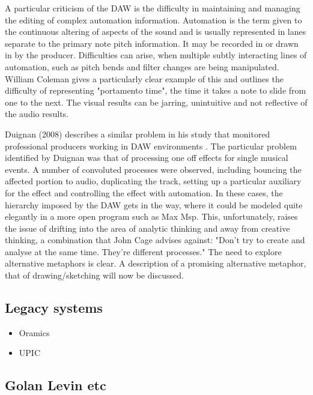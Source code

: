 \documentclass[a4paper,12pt]{article}
\begin{document}
A particular criticism of the DAW is the difficulty in maintaining and managing
the editing of complex automation information. Automation is the term given to
the continuous altering of aspects of the sound and is usually represented in
lanes separate to the primary note pitch information. It may be recorded in or
drawn in by the producer. Difficulties can arise, when multiple subtly
interacting lines of automation, such as pitch bends and filter changes are
being manipulated. William Coleman gives a particularly clear example of this
and outlines the difficulty of representing "portamento time", the time it takes
a note to slide from one to the next. The visual results can be jarring,
unintuitive and not reflective of the audio results.

\begin{caution}
Duignan (2008) describes a similar problem in his study that monitored
professional producers working in DAW environments
\cite[p. 156]{duignan_computer_2008}. The particular problem identified by
Duignan was that of processing one off effects for single musical events. A
number of convoluted processes were observed, including bouncing the affected
portion to audio, duplicating the track, setting up a particular auxiliary for
the effect and controlling the effect with automation. In these cases, the
hierarchy imposed by the DAW gets in the way, where it could be modeled quite
elegantly in a more open program such as Max Msp. This, unfortunately, raises
the issue of drifting into the area of analytic thinking and away from creative
thinking, a combination that John Cage advises against: "Don't try to create and
analyse at the same time. They're different processes." \cite{popova_10_2012} The
need to explore alternative metaphors is clear. A description of a promising
alternative metaphor, that of drawing/sketching will now be discussed.
\end{caution}

\subsection{Legacy systems}
\label{sec:org6621bf6}
\begin{itemize}
\item Oramics
\item UPIC
\end{itemize}

\subsection{Golan Levin etc}
\label{sec:orgd921e72}
\end{document}
